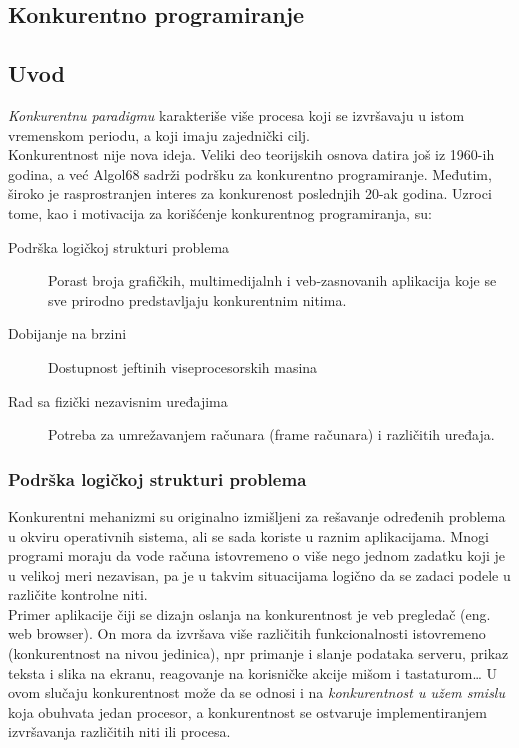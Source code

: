 \documentclass[../main.tex]{subfiles}
\begin{document}
\pagebreak
\begin{boxnaslovi}
\section{Konkurentno programiranje} 								%
\end{boxnaslovi}

\subsection{Uvod}										%

{\it Konkurentnu paradigmu} karakteriše više procesa koji se izvršavaju u istom vremenskom periodu, a koji imaju zajednički cilj. 
\\
Konkurentnost nije nova ideja. Veliki deo teorijskih osnova datira još iz 1960-ih godina, a već Algol68 sadrži podršku za konkurentno programiranje. Međutim, široko je rasprostranjen interes za konkurenost poslednjih 20-ak godina. Uzroci tome, kao i motivacija za korišćenje konkurentnog programiranja, su:
\begin{description}
\item[Podrška logičkoj strukturi problema] \hfill

Porast broja grafičkih, multimedijalnh i veb-zasnovanih aplikacija koje se sve prirodno predstavljaju konkurentnim nitima.
\item[Dobijanje na brzini] \hfill

Dostupnost jeftinih viseprocesorskih masina

\item[Rad sa fizički nezavisnim uređajima] \hfill

Potreba za umrežavanjem računara (frame računara) i različitih uređaja.
\end{description}

\subsubsection{Podrška logičkoj strukturi problema}			%
Konkurentni mehanizmi su originalno izmišljeni za rešavanje određenih problema u okviru operativnih sistema, ali se sada koriste u raznim aplikacijama. Mnogi programi moraju da vode računa istovremeno o više nego jednom zadatku koji je u velikoj meri nezavisan, pa je u takvim situacijama logično da se zadaci podele u različite kontrolne niti.
\\
\indent Primer aplikacije čiji se dizajn oslanja na konkurentnost je veb pregledač (eng. web browser). On mora da izvršava više različitih funkcionalnosti istovremeno (konkurentnost na nivou jedinica), npr primanje i slanje podataka serveru, prikaz teksta i slika na ekranu, reagovanje na korisničke akcije mišom i tastaturom\ldots
U ovom slučaju konkurentnost može da se odnosi i na {\it konkurentnost u užem smislu} koja obuhvata jedan procesor, a konkurentnost se ostvaruje implementiranjem izvršavanja različitih niti ili procesa.
\end{document}
